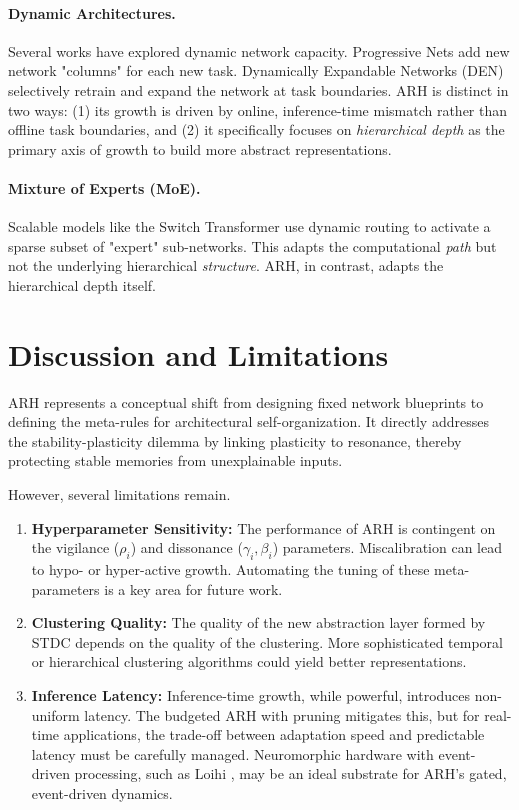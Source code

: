\documentclass{article}
\begin{document}
\paragraph{Dynamic Architectures.} Several works have explored dynamic network capacity. Progressive Nets \citep{rusu2016} add new network "columns" for each new task. Dynamically Expandable Networks (DEN) \citep{den2018} selectively retrain and expand the network at task boundaries. ARH is distinct in two ways: (1) its growth is driven by online, inference-time mismatch rather than offline task boundaries, and (2) it specifically focuses on \emph{hierarchical depth} as the primary axis of growth to build more abstract representations.
\paragraph{Mixture of Experts (MoE).} Scalable models like the Switch Transformer \citep{switch2021} use dynamic routing to activate a sparse subset of "expert" sub-networks. This adapts the computational \emph{path} but not the underlying hierarchical \emph{structure}. ARH, in contrast, adapts the hierarchical depth itself.

\section{Discussion and Limitations}
ARH represents a conceptual shift from designing fixed network blueprints to defining the meta-rules for architectural self-organization. It directly addresses the stability-plasticity dilemma by linking plasticity to resonance, thereby protecting stable memories from unexplainable inputs.

However, several limitations remain.
\begin{enumerate}
    \item \textbf{Hyperparameter Sensitivity:} The performance of ARH is contingent on the vigilance ($\rho_i$) and dissonance ($\gamma_i, \beta_i$) parameters. Miscalibration can lead to hypo- or hyper-active growth. Automating the tuning of these meta-parameters is a key area for future work.
    \item \textbf{Clustering Quality:} The quality of the new abstraction layer formed by STDC depends on the quality of the clustering. More sophisticated temporal or hierarchical clustering algorithms could yield better representations.
    \item \textbf{Inference Latency:} Inference-time growth, while powerful, introduces non-uniform latency. The budgeted ARH with pruning mitigates this, but for real-time applications, the trade-off between adaptation speed and predictable latency must be carefully managed. Neuromorphic hardware with event-driven processing, such as Loihi \citep{loihi2018}, may be an ideal substrate for ARH's gated, event-driven dynamics.
\end{enumerate}
\end{document}
